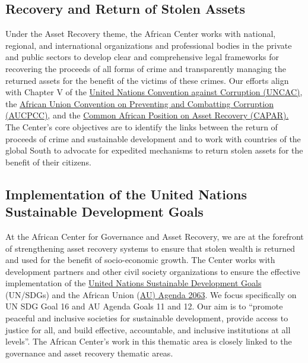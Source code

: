 \documentclass[
  letterpaper,
  DIV=11,
  numbers=noendperiod]{scrreprt}
\begin{document}
\subsection*{Recovery and Return of Stolen
Assets}\label{recovery-and-return-of-stolen-assets}

Under the Asset Recovery theme, the African Center works with national,
regional, and international organizations and professional bodies in the
private and public sectors to develop clear and comprehensive legal
frameworks for recovering the proceeds of all forms of crime and
transparently managing the returned assets for the benefit of the
victims of these crimes. Our efforts align with Chapter V of the
\href{https://www.unodc.org/documents/brussels/UN_Convention_Against_Corruption.pdf}{United
Nations Convention against Corruption (UNCAC)}, the
\href{https://au.int/sites/default/files/treaties/36382-treaty-0028_-_african_union_convention_on_preventing_and_combating_corruption_e.pdf}{African
Union Convention on Preventing and Combatting Corruption (AUCPCC)}, and
the
\href{https://au.int/sites/default/files/newsevents/workingdocuments/43786-wd-42297-doc-COMMON-AFRICAN-POSITION-ON-ASSEST-RECOVERY-ENGLISH-NEWLY-PROOFREAD-1.pdf}{Common
African Position on Asset Recovery (CAPAR).} The Center's core
objectives are to identify the links between the return of proceeds of
crime and sustainable development and to work with countries of the
global South to advocate for expedited mechanisms to return stolen
assets for the benefit of their citizens.

\subsection*{Implementation of the United Nations Sustainable
Development
Goals}\label{implementation-of-the-united-nations-sustainable-development-goals}

At the African Center for Governance and Asset Recovery, we are at the
forefront of strengthening asset recovery systems to ensure that stolen
wealth is returned and used for the benefit of socio-economic growth.
The Center works with development partners and other civil society
organizations to ensure the effective implementation of the
\href{https://sdgs.un.org/goals}{United Nations Sustainable Development
Goals} (UN/SDGs) and the African Union
(\href{https://au.int/en/agenda2063/overview}{AU) Agenda 2063}. We focus
specifically on UN SDG Goal 16 and AU Agenda Goals 11 and 12. Our aim is
to ``promote peaceful and inclusive societies for sustainable
development, provide access to justice for all, and build effective,
accountable, and inclusive institutions at all levels''. The African
Center's work in this thematic area is closely linked to the governance
and asset recovery thematic areas.
\end{document}
